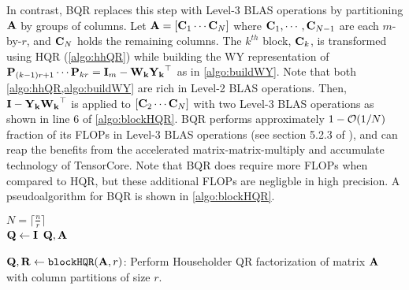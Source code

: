 In contrast, BQR replaces this step with Level-3 BLAS operations by partitioning $\mathbf{A}$ by groups of columns.
Let $\mathbf{A} = [\mathbf{C}_1 \cdots  \mathbf{C}_N]$ where $\mathbf{C}_1,\cdots,\mathbf{C}_{N-1}$ are each $m$-by-$r$, and $\mathbf{C}_N$ holds the remaining columns.
The $k^{th}$ block, $\mathbf{C}_k$, is transformed using HQR (\cref{algo:hhQR}) while building the WY representation of $\mathbf{P}_{(k-1)r+1}\cdots\mathbf{P}_{kr} = \mathbf{I}_m -\mathbf{W_k}\mathbf{Y_k}^{\top}$ as in \cref{algo:buildWY}.
Note that both \cref{algo:hhQR,algo:buildWY} are rich in Level-2 BLAS operations.
Then, $\mathbf{I} -\mathbf{Y_k}\mathbf{W_k}^{\top}$ is applied to $[\mathbf{C}_2 \cdots  \mathbf{C}_N]$ with two Level-3 BLAS operations as shown in line 6 of \cref{algo:blockHQR}.
BQR performs approximately $1-\mathcal{O}(1/N)$ fraction of its FLOPs in Level-3 BLAS operations (see section 5.2.3 of \cite{golub2013matrix}), and can reap the benefits from the accelerated matrix-matrix-multiply and accumulate technology of TensorCore. 
Note that BQR does require more FLOPs when compared to HQR, but these additional FLOPs are negligble in high precision.
A pseudoalgorithm for BQR is shown in \cref{algo:blockHQR}.
\begin{algorithm2e}
	\DontPrintSemicolon %
	
	$N=\lceil \frac{n}{r}\rceil$\\
	$\mathbf{Q}\gets \mathbf{I}$
	\Return $\mathbf{Q},\mathbf{A}$
	\caption{$\mathbf{Q},\mathbf{R}\gets {\tt blockHQR}(\mathbf{A}, r)$: Perform Householder QR factorization of matrix $\mathbf{A}$ with column partitions of size $r$.}
	\label{algo:blockHQR}
\end{algorithm2e}
